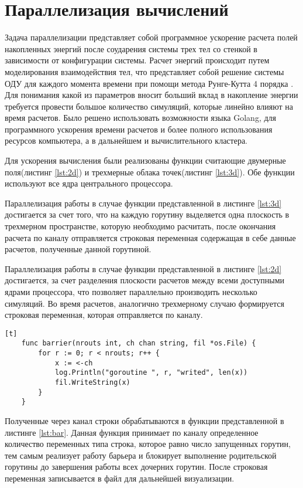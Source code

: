 \section{Параллелизация вычислений}

Задача параллелизации представляет собой программное ускорение расчета полей накопленных энергий после соударения системы трех тел со стенкой в зависимости
от конфигурации системы. Расчет энергий происходит путем моделирования взаимодействия тел, что представляет собой решение системы ОДУ для каждого момента
времени при помощи метода Рунге-Кутта 4 порядка \cite{BahvalJidkovKobel1987}. Для понимания какой из параметров вносит больший вклад в накопление энергии 
требуется провести большое количество симуляций, которые линейно влияют на время расчетов. Было решено использовать возможности языка Golang, для программного
ускорения времени расчетов и более полного использования ресурсов компьютера, а в дальнейшем и вычислительного кластера.

Для ускорения вычисления были реализованы функции считающие двумерные поля(листинг \ref{lst:2d}) и трехмерные облака точек(листинг \ref{lst:3d}).
Обе функции используют все ядра центрального процессора.



Параллелизация работы в случае функции представленной в листинге \ref{lst:3d} достигается за счет того, что на каждую горутину выделяется одна плоскость в трехмерном пространстве, 
которую необходимо расчитать, после окончания расчета по каналу отправляется строковая переменная содержащая в себе данные расчетов, полученные данной горутиной.

Параллелизация работы в случае функции представленной в листинге \ref{lst:2d} достигается, за счет разделения плоскости расчетов между всеми доступными ядрами процессора,
что позволяет параллельно производить несколько симуляций. Во время расчетов, аналогично трехмерному случаю формируется строковая переменная, которая отправляется по каналу.


\begin{lstlisting}[numbers=none, label=lst:bar,language=Golang, caption=Функция барьер][t]
    func barrier(nrouts int, ch chan string, fil *os.File) {
        for r := 0; r < nrouts; r++ {
            x := <-ch
            log.Println("goroutine ", r, "writed", len(x))
            fil.WriteString(x)
        }
    }
\end{lstlisting}

Полученные через канал строки обрабатываются в функции представленной в листинге \ref{lst:bar}. Данная функция принимает по каналу определенное количество переменных типа строка,
которое равно число запущенных горутин, тем самым реализует работу барьера и блокирует выполнение родительской горутины до завершения работы всех дочерних горутин.
После строковая переменная записывается в файл для дальнейшей визуализации.